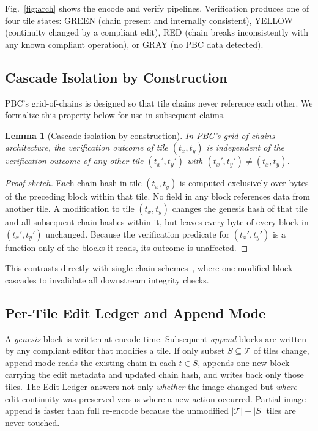 \documentclass[conference]{IEEEtran}
\newtheorem{lemma}{Lemma}
\begin{document}
Fig.~\ref{fig:arch} shows the encode and verify pipelines. Verification
produces one of four tile states: GREEN (chain present and internally
consistent), YELLOW (continuity changed by a compliant edit), RED
(chain breaks inconsistently with any known compliant operation), or
GRAY (no PBC data detected).

\subsection{Cascade Isolation by Construction}

PBC's grid-of-chains is designed so that tile chains never reference
each other. We formalize this property below for use in subsequent
claims.

\begin{lemma}[Cascade isolation by construction]
\label{lem:isolation}
In PBC's grid-of-chains architecture, the verification outcome of tile
$(t_x, t_y)$ is independent of the verification outcome of any other
tile $(t_x', t_y')$ with $(t_x', t_y') \neq (t_x, t_y)$.
\end{lemma}

\begin{proof}[Proof sketch]
Each chain hash in tile $(t_x, t_y)$ is computed exclusively over bytes
of the preceding block within that tile. No field in any block
references data from another tile. A modification to tile $(t_x, t_y)$
changes the genesis hash of that tile and all subsequent chain hashes
within it, but leaves every byte of every block in $(t_x', t_y')$
unchanged. Because the verification predicate for $(t_x', t_y')$ is a
function only of the blocks it reads, its outcome is unaffected.
\end{proof}

This contrasts directly with single-chain
schemes~\cite{he2008blockchain,fang2020blockchain}, where one modified
block cascades to invalidate all downstream integrity checks.

\subsection{Per-Tile Edit Ledger and Append Mode}

A \emph{genesis} block is written at encode time. Subsequent
\emph{append} blocks are written by any compliant editor that modifies a
tile. If only subset $S \subseteq \mathcal{T}$ of tiles change, append
mode reads the existing chain in each $t \in S$, appends one new block
carrying the edit metadata and updated chain hash, and writes back only
those tiles. The Edit Ledger answers not only \emph{whether} the image
changed but \emph{where} edit continuity was preserved versus where a
new action occurred. Partial-image append is faster than full re-encode
because the unmodified $|\mathcal{T}| - |S|$ tiles are never touched.
\end{document}
